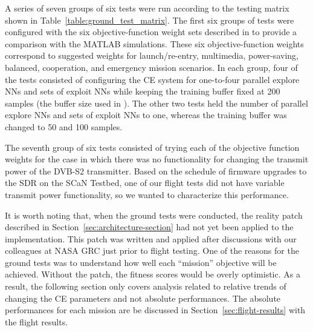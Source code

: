 \documentclass[journal]{IEEEtran}
\begin{document}
A series of seven groups of six tests were run according to the testing matrix shown in Table~\ref{table:ground_test_matrix}.  The first six groups of tests were configured with the six objective-function weight sets described in \cite{paulo-jrnl} to provide a comparison with the MATLAB simulations.  These six objective-function weights correspond to suggested weights for launch/re-entry, multimedia, power-saving, balanced, cooperation, and emergency mission scenarios.  In each group, four of the tests consisted of configuring the CE system for one-to-four parallel explore NNs and sets of exploit NNs while keeping the training buffer fixed at 200 samples (the buffer size used in \cite{paulo-jrnl}).  The other two tests held the number of parallel explore NNs and sets of exploit NNs to one, whereas the training buffer was changed to 50 and 100 samples.

The seventh group of six tests consisted of trying each of the objective function weights for the case in which there was no functionality for changing the transmit power of the DVB-S2 transmitter.  Based on the schedule of firmware upgrades to the SDR on the SCaN Testbed, one of our flight tests did not have variable transmit power functionality, so we wanted to characterize this performance.

It is worth noting that, when the ground tests were conducted, the reality patch described in Section~\ref{sec:architecture-section} had not yet been applied to the implementation.  This patch was written and applied after discussions with our colleagues at NASA GRC just prior to flight testing.  One of the reasons for the ground tests was to understand how well each ``mission'' objective will be achieved.  Without the patch, the fitness scores would be overly optimistic.  As a result, the following section only covers analysis related to relative trends of changing the CE parameters and not absolute performances.  The absolute performances for each mission are be discussed in Section~\ref{sec:flight-results} with the flight results.
\end{document}
